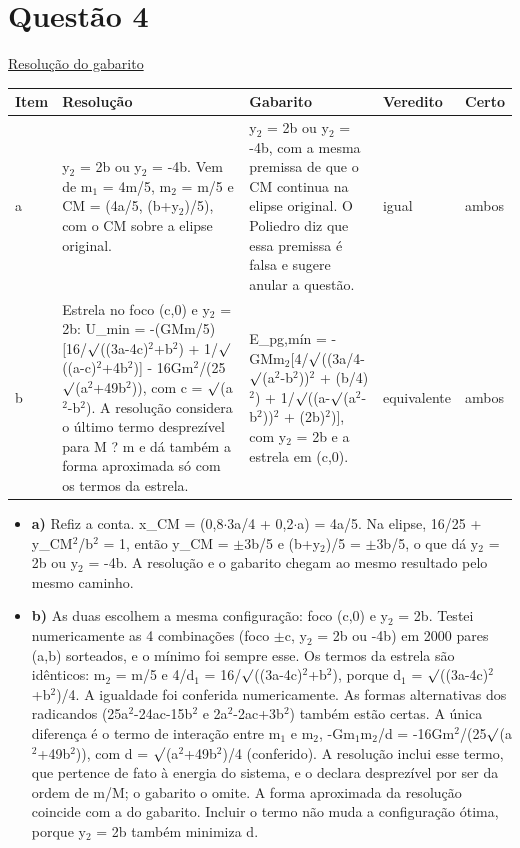 \documentclass{article}%
\begin{document}
\section*{Questão 4}%
\href{https://poliedroresolve.sistemapoliedro.com.br/vestibulares/ita/2026/ita-2-fase-dia-3-30-10-2025-2-fase-dia-3/dissertativa-4-fisica-2-fase-dia-3-ita-2026}{Resolução do gabarito}\par\smallskip%
\begin{longtable}{@{}p{} p{} p{} p{} p{}@{}}\toprule Item & Resolução & Gabarito & Veredito & Certo \\ \midrule
a & y$_{2}$ = 2b ou y$_{2}$ = -4b. Vem de m$_{1}$ = 4m/5, m$_{2}$ = m/5 e CM = (4a/5, (b+y$_{2}$)/5), com o CM sobre a elipse original. & y$_{2}$ = 2b ou y$_{2}$ = -4b, com a mesma premissa de que o CM continua na elipse original. O Poliedro diz que essa premissa é falsa e sugere anular a questão. & igual & ambos \\
b & Estrela no foco (c,0) e y$_{2}$ = 2b: U\_min = -(GMm/5){[}16/$\surd$((3a-4c)$^2$+b$^2$) + 1/$\surd$((a-c)$^2$+4b$^2$){]} - 16Gm$^2$/(25$\surd$(a$^2$+49b$^2$)), com c = $\surd$(a$^2$-b$^2$). A resolução considera o último termo desprezível para M ? m e dá também a forma aproximada só com os termos da estrela. & E\_pg,mín = -GMm$_{2}${[}4/$\surd$((3a/4-$\surd$(a$^2$-b$^2$))$^2$ + (b/4)$^2$) + 1/$\surd$((a-$\surd$(a$^2$-b$^2$))$^2$ + (2b)$^2$){]}, com y$_{2}$ = 2b e a estrela em (c,0). & equivalente & ambos \\
\bottomrule\end{longtable}%
\begin{itemize}%
\item%
\textbf{a)} Refiz a conta. x\_CM = (0,8$\cdot$3a/4 + 0,2$\cdot$a) = 4a/5. Na elipse, 16/25 + y\_CM$^2$/b$^2$ = 1, então y\_CM = $\pm$3b/5 e (b+y$_{2}$)/5 = $\pm$3b/5, o que dá y$_{2}$ = 2b ou y$_{2}$ = -4b. A resolução e o gabarito chegam ao mesmo resultado pelo mesmo caminho.%
\item%
\textbf{b)} As duas escolhem a mesma configuração: foco (c,0) e y$_{2}$ = 2b. Testei numericamente as 4 combinações (foco $\pm$c, y$_{2}$ = 2b ou -4b) em 2000 pares (a,b) sorteados, e o mínimo foi sempre esse. Os termos da estrela são idênticos: m$_{2}$ = m/5 e 4/d$_{1}$ = 16/$\surd$((3a-4c)$^2$+b$^2$), porque d$_{1}$ = $\surd$((3a-4c)$^2$+b$^2$)/4. A igualdade foi conferida numericamente. As formas alternativas dos radicandos (25a$^2$-24ac-15b$^2$ e 2a$^2$-2ac+3b$^2$) também estão certas. A única diferença é o termo de interação entre m$_{1}$ e m$_{2}$, -Gm$_{1}$m$_{2}$/d = -16Gm$^2$/(25$\surd$(a$^2$+49b$^2$)), com d = $\surd$(a$^2$+49b$^2$)/4 (conferido). A resolução inclui esse termo, que pertence de fato à energia do sistema, e o declara desprezível por ser da ordem de m/M; o gabarito o omite. A forma aproximada da resolução coincide com a do gabarito. Incluir o termo não muda a configuração ótima, porque y$_{2}$ = 2b também minimiza d.%
\end{itemize}%
\end{document}
